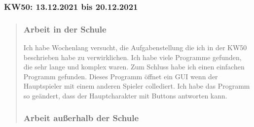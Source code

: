 
\subsubsection{KW50: 13.12.2021 bis 20.12.2021}
\begin{quote}
	\subsubsection*{Arbeit in der Schule}
	Ich habe Wochenlang versucht, die Aufgabenstellung die ich in der KW50 beschrieben habe zu verwirklichen. Ich habe viele Programme gefunden, die sehr lange und komplex waren. Zum Schluss habe ich einen einfachen Programm gefunden. Dieses Programm öffnet ein GUI wenn der Hauptspieler mit einem anderen Spieler collediert. Ich habe das Programm so geändert, dass  der Hauptcharakter mit Buttons antworten kann.

	\subsubsection*{Arbeit außerhalb der Schule}

	
\end{quote}
